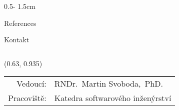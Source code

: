 \documentclass[a0paper]{uioposter}
\begin{document}
\begin{frame}
\begin{columns}[onlytextwidth]
\begin{column}{0.5\textwidth - 1.5cm}
      \begin{block}{References}
        \lipsum[6]
      \end{block}

      \begin{block}{Kontakt}
        \lipsum[75]
      \end{block}
    \end{column}


  \end{columns}


  \begin{textblock}{0.5}(0.63, 0.935)
    \color{white}
    \sffamily
    \begin{tabular}{rl}
      Vedoucí:    & RNDr.~Martin Svoboda,~PhD.
      \\
      Pracoviště: & Katedra softwarového inženýrství
    \end{tabular}
  \end{textblock}


\end{frame}
\end{document}
